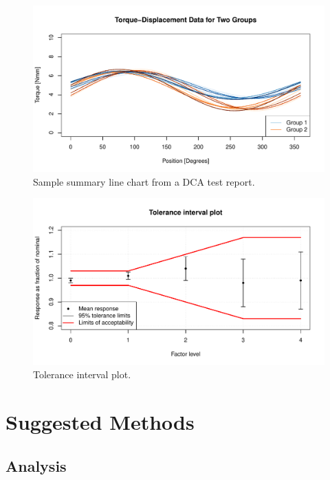 \documentclass[11pt,a4paper,article]{memoir} %
\begin{document}
\begin{figure}
	\includegraphics[width=\textwidth]{overlaid_line_chart.pdf}
	\caption{Sample summary line chart from a DCA test report.}
	\label{fig:line_plots}
\end{figure}
\begin{figure}
	\includegraphics[width=\textwidth]{tolerance_intervals_plot.pdf}
	\caption{Tolerance interval plot.}
	\label{fig:tolerance_intervals_plot}
\end{figure}

\chapter{Suggested Methods}\label{suggested_methods}
\label{chap:modernstats}
\section{Analysis}
\end{document}
